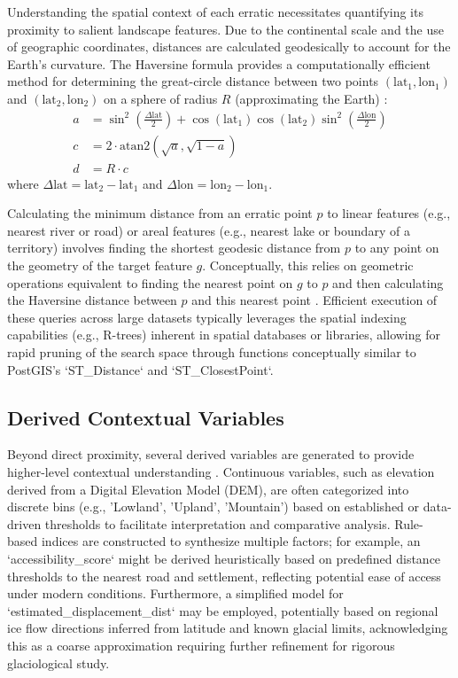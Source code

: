 Understanding the spatial context of each erratic necessitates quantifying its proximity to salient landscape features. Due to the continental scale and the use of geographic coordinates, distances are calculated geodesically to account for the Earth's curvature. The Haversine formula provides a computationally efficient method for determining the great-circle distance between two points $(\text{lat}_1, \text{lon}_1)$ and $(\text{lat}_2, \text{lon}_2)$ on a sphere of radius $R$ (approximating the Earth) \cite{Sinnott1984}:
\begin{align*}
    a &= \sin^2\left(\frac{\Delta \text{lat}}{2}\right) + \cos(\text{lat}_1) \cos(\text{lat}_2) \sin^2\left(\frac{\Delta \text{lon}}{2}\right) \\
    c &= 2 \cdot \text{atan2}(\sqrt{a}, \sqrt{1-a}) \\
    d &= R \cdot c
\end{align*}
where $\Delta \text{lat} = \text{lat}_2 - \text{lat}_1$ and $\Delta \text{lon} = \text{lon}_2 - \text{lon}_1$.

Calculating the minimum distance from an erratic point $p$ to linear features (e.g., nearest river or road) or areal features (e.g., nearest lake or boundary of a territory) involves finding the shortest geodesic distance from $p$ to any point on the geometry of the target feature $g$. Conceptually, this relies on geometric operations equivalent to finding the nearest point on $g$ to $p$ and then calculating the Haversine distance between $p$ and this nearest point \cite{Goodchild1992}. Efficient execution of these queries across large datasets typically leverages the spatial indexing capabilities (e.g., R-trees) inherent in spatial databases or libraries, allowing for rapid pruning of the search space \cite{Guttman1984} through functions conceptually similar to PostGIS's `ST\_Distance` and `ST\_ClosestPoint`.

\subsection{Derived Contextual Variables}
\label{subsec:derived_vars}

Beyond direct proximity, several derived variables are generated to provide higher-level contextual understanding \cite{Burrough2015}. Continuous variables, such as elevation derived from a Digital Elevation Model (DEM), are often categorized into discrete bins (e.g., 'Lowland', 'Upland', 'Mountain') based on established or data-driven thresholds to facilitate interpretation and comparative analysis. Rule-based indices are constructed to synthesize multiple factors; for example, an `accessibility\_score` might be derived heuristically based on predefined distance thresholds to the nearest road and settlement, reflecting potential ease of access under modern conditions. Furthermore, a simplified model for `estimated\_displacement\_dist` may be employed, potentially based on regional ice flow directions inferred from latitude and known glacial limits, acknowledging this as a coarse approximation requiring further refinement for rigorous glaciological study.

